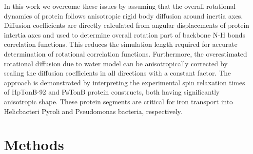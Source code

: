 \documentclass[pre,aps,floatfix,authordate1-4,twocolumn]{revtex4-1}
\begin{document}
In this work we overcome these issues by assuming that the overall
rotational dynamics of protein follows
anisotropic rigid body diffusion around inertia axes. 
Diffusion coefficients are directly calculated from angular displacements of
protein intertia axes and used to determine overall rotation part
of backbone N-H bonds correlation functions.
This reduces the simulation length required for accurate determination
of rotational correlation functions. Furthermore, the overestimated
rotational diffusion due to water model can be anisotropically corrected
by scaling the diffusion coefficients in all directions with a constant
factor. The approach is demonstrated by interpreting the experimental
spin relaxation times of HpTonB-92 \cite{ciragan16} and PsTonB \cite{??}
protein constructs, both having significantly anisotropic shape. 
These protein segments are critical for iron transport into Helicbacteri
Pyroli and Pseudomonas bacteria, respectively.


\section{Methods}
\end{document}

